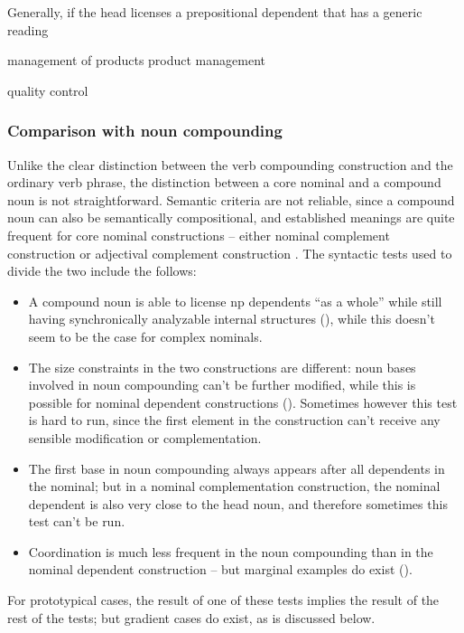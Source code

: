 \documentclass[UTF8, a4paper, oneside, scheme=plain, 12pt]{ctexbook}
\newcommand*{\citesec}[1]{\S~{#1}}
\newcommand*{\citechap}[1]{Ch.~{#1}}
\begin{document}
Generally, if the head licenses a prepositional dependent
that has a generic reading 

\begin{exe}
    \ex \begin{xlist}
        \ex management of products
        \ex product management 
    \end{xlist} 
    \ex quality control 
\end{exe}




\subsubsection{Comparison with noun compounding}\label{sec:np.nominal.nominal-attributive.noun-compound-compare}

Unlike the clear distinction 
between the verb compounding construction 
and the ordinary verb phrase, 
the distinction between a core nominal 
and a compound noun is not straightforward. 
Semantic criteria are not reliable, 
since a compound noun can also be semantically compositional, 
and established meanings are quite frequent for core nominal constructions -- 
either nominal complement construction or adjectival complement construction 
\citep[\citechap{5}, \citesec{14.4}]{cgel}. 
The syntactic tests used to divide the two include the follows:
\begin{itemize}
    \item A compound noun is able to license \acs{np} dependents 
        ``as a whole'' while still having synchronically analyzable internal structures 
        (), 
        while this doesn't seem to be the case for 
        complex nominals. 

    \item The size constraints in the two constructions are different:
    noun bases involved in noun compounding 
    can't be further modified,
    while this is possible for nominal dependent constructions 
    (). 
    Sometimes however this test is hard to run, 
    since the first element in the construction can't receive any sensible modification 
    or complementation. 

    \item The first base in noun compounding 
        always appears after all dependents in the nominal; 
        but in a nominal complementation construction, 
        the nominal dependent is also very close to the head noun, 
        and therefore sometimes this test can't be run.

    \item Coordination is much less frequent in 
    the noun compounding than in the nominal dependent construction 
    -- but marginal examples do exist ().
\end{itemize}
For prototypical cases, the result of one of these tests 
implies the result of the rest of the tests; 
but gradient cases do exist, 
as is discussed below. 
\end{document}
